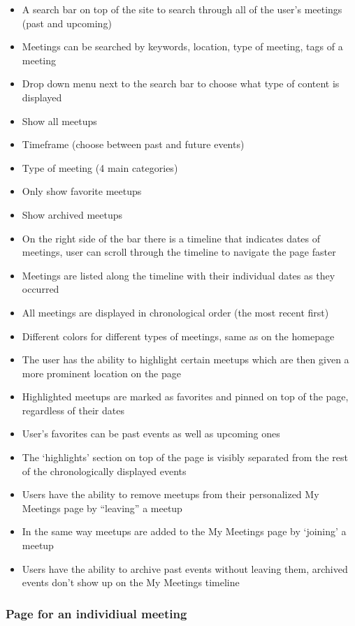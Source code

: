 \documentclass[conference]{IEEEtran}
\begin{document}
\begin{itemize}
\item A search bar on top of the site to search through all of the
user’s meetings (past and upcoming)
\item Meetings can be searched by keywords, location, type of
meeting, tags of a meeting
\item Drop down menu next to the search bar to choose what
type of content is displayed
\item Show all meetups
\item Timeframe (choose between past and future
events)
\item Type of meeting (4 main categories)
\item Only show favorite meetups
\item Show archived meetups
\item On the right side of the bar there is a timeline that indicates dates of meetings, user can scroll through the timeline to navigate the page faster
\item Meetings are listed along the timeline with their individual dates as they occurred
\item All meetings are displayed in chronological order (the most recent first)
\item Different colors for different types of meetings, same as on the homepage
\item The user has the ability to highlight certain meetups which are then given a more prominent location on the page
\item Highlighted meetups are marked as favorites and pinned on top of the page, regardless of their dates
\item User’s favorites can be past events as well as upcoming ones
\item The ‘highlights’ section on top of the page is visibly separated from the rest of the chronologically displayed events
\item Users have the ability to remove meetups from their personalized My Meetings page by “leaving” a meetup
\item In the same way meetups are added to the My Meetings page by ‘joining’ a meetup
\item Users have the ability to archive past events without leaving them, archived events don’t show up on the My Meetings timeline
\end{itemize}

\subsubsection{Page for an individiual meeting}
\end{document}
